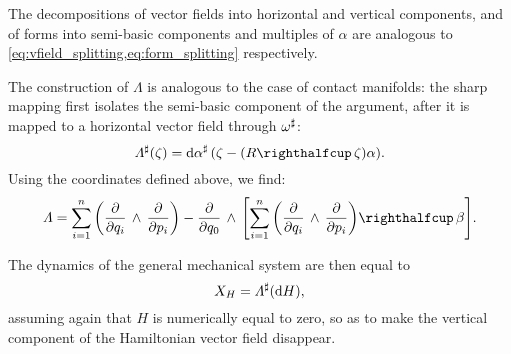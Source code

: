 The decompositions of vector fields into horizontal and vertical components, and of forms into semi-basic components and multiples of \(\alpha\) are analogous to \cref{eq:vfield_splitting,eq:form_splitting} respectively.

The construction of \(\Lambda\) is analogous to the case of contact manifolds: the sharp mapping first isolates the semi-basic component of the argument, after it is mapped to a horizontal vector field through \(\omega^\sharp\):
\begin{equation}
     \fromDual{\Lambda}(\zeta) = \fromDual{\dd{\alpha}}\qty(\zeta - (\intpr{R}{\zeta})\alpha).
\end{equation}
Using the coordinates defined above, we find:
\begin{equation}
    \Lambda = \sum_{i=1}^n \qty(\wedgep{\pdv{}{q_i}}{\pdv{}{p_i}}) - \wedgep{\pdv{}{q_0}}{\qty[\intpr{\sum_{i=1}^n \qty(\wedgep{\pdv{}{q_i}}{\pdv{}{p_i}})}{\beta}]}.
    \label{eq:general_bivector}
\end{equation}

The dynamics of the general mechanical system are then equal to 
\begin{equation} 
    X_H = \Lambda^\sharp(\dd{H}), 
    \label{eq:general_isomorphism}
\end{equation}
assuming again that \(H\) is numerically equal to zero, so as to make the vertical component of the Hamiltonian vector field disappear. 

